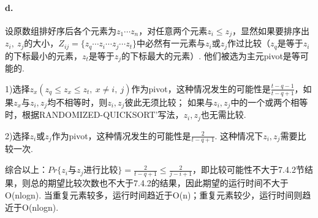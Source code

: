 \documentclass[UTF8]{ctexart}
\begin{document}
\paragraph{d. } 设原数组排好序后各个元素为$z_1\cdots z_n$，对任意两个元素$z_i\leq z_j$，显然如果要排序出$z_i,\ z_j$的大小，$Z_{ij}=\{z_q\cdots z_{i}\cdots z_j\cdots z_t\}$中必然有一元素与$z_i$或$z_j$作过比较（$z_q$是等于$z_i$的下标最小的元素，$z_t$是等于$z_j$的下标最大的元素）. 他们被选为主元pivot是等可能的. \par 1)选择$z_x(z_q\leq z_x\leq z_t,\ x\neq i,\ j)$作为pivot，这种情况发生的可能性是$\frac{t-q-1}{t-q+1}$，如果$z_x$与$z_i, z_j$均不相等时，则$z_i, z_j$彼此无须比较； 如果与$z_i, z_j$中的一个或两个相等时，根据RANDOMIZED-QUICKSORT'写法，$z_i, z_j$也无需比较.\par 2)选择$z_i$或$z_j$作为pivot，这种情况发生的可能性是$\frac{2}{t-q+1}$. 这种情况下$z_i, z_j$需要比较一次.\par
综合以上：$\displaystyle{Pr\{z_i\text{与}z_j\text{进行比较}\}=\frac{2}{t-q+1}\leq \frac{2}{j-i+1}}$，即比较可能性不大于7.4.2节结果，则总的期望比较次数也不大于7.4.2的结果，因此期望的运行时间不大于O(nlogn). 当重复元素较多，运行时间趋近于O(n)；重复元素较少，运行时间则趋近于O(nlogn).
\end{document}
